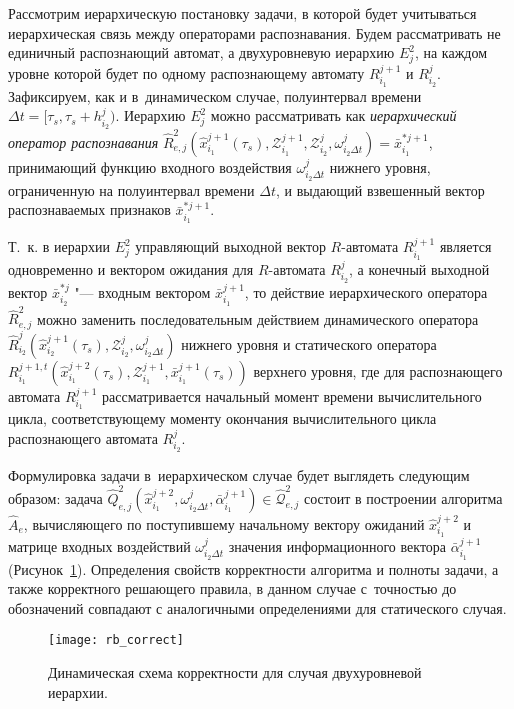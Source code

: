 Рассмотрим иерархическую постановку задачи, в которой будет учитываться иерархическая связь между операторами распознавания. Будем рассматривать не единичный распознающий автомат, а двухуровневую иерархию $E_j^2$, на каждом уровне которой будет по одному распознающему автомату $R_{i_1}^{j+1}$ и $R_{i_2}^j$. Зафиксируем, как и в~динамическом случае, полуинтервал времени $\Delta t=[\tau_s,\tau_s+h_{i_2}^j)$. Иерархию $E_j^2$ можно рассматривать как \textit{иерархический оператор распознавания} $\hat R_{e,j}^2(\hat x_{i_1}^{j+1}(\tau_s),\mathcal Z_{i_1}^{j+1},\mathcal Z_{i_2}^j,\omega_{i_2\Delta t}^j)=\bar x_{i_1}^{*j+1}$, принимающий функцию входного воздействия $\omega_{i_2\Delta t}^j$ нижнего уровня, ограниченную на полуинтервал времени $\Delta t$, и выдающий взвешенный вектор распознаваемых признаков $\bar x_{i_1}^{*j+1}$. 

Т.~к. в иерархии $E_j^2$ управляющий выходной вектор $R$-автомата $R_{i_1}^{j+1}$ является одновременно и вектором ожидания для $R$-автомата $R_{i_2}^j$, а конечный выходной вектор $\bar x_{i_2}^{*j}$ "--- входным вектором $\bar x_{i_1}^{j+1}$, то действие иерархического оператора $\hat R_{e,j}^2$ можно заменить последовательным действием динамического оператора $\hat R_{i_2}^j(\hat x _{i_2}^{j+1}(\tau_s),\mathcal Z_{i_2}^j,\omega_{i_2\Delta t}^j)$ нижнего уровня и статического оператора $R_{i_1}^{j+1,t}(\hat x _{i_1}^{j+2}(\tau_s),\mathcal Z_{i_1}^{j+1},\bar x_{i_1}^{j+1}(\tau_s))$ верхнего уровня, где для распознающего автомата $R_{i_1}^{j+1}$ рассматривается начальный момент времени вычислительного цикла, соответствующему моменту окончания вычислительного цикла распознающего автомата $R_{i_2}^j$.

Формулировка задачи в~иерархическом случае будет выглядеть следующим образом: задача $\hat Q_{e,j}^2(\hat x_{i_1}^{j+2},\omega_{i_2\Delta t}^j,\bar\alpha_{i_1}^{j+1})\in\hat{\mathcal Q}_{e,j}^2$ состоит в построении алгоритма $\hat A_e$, вычисляющего по поступившему начальному вектору ожиданий $\hat x_{i_1}^{j+2}$ и матрице входных воздействий $\omega_{i_2\Delta t}^j$ значения информационного вектора $\bar\alpha_{i_1}^{j+1}$ (Рисунок~\ref{fig:rb_correct_hier}). Определения свойств корректности алгоритма и полноты задачи, а также корректного решающего правила, в данном случае с~точностью до обозначений совпадают с аналогичными определениями для статического случая.

\begin{figure}[h]
	\centering
	\texttt{[image: rb\_correct]}
	\caption{Динамическая схема корректности для случая двухуровневой иерархии.}
	\label{fig:rb_correct_hier}
\end{figure}

